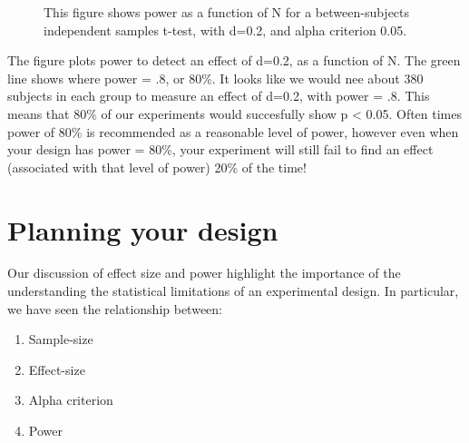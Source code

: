 \documentclass[
  letterpaper,
  DIV=11,
  numbers=noendperiod]{scrreprt}
\providecommand{\tightlist}{%
  \setlength{\itemsep}{0pt}\setlength{\parskip}{0pt}}\usepackage{longtable,booktabs,array}
\begin{document}
\begin{figure}


\caption{\label{fig-5.5powercurveN}This figure shows power as a function
of N for a between-subjects independent samples t-test, with d=0.2, and
alpha criterion 0.05.}

\end{figure}%

The figure plots power to detect an effect of d=0.2, as a function of N.
The green line shows where power = .8, or 80\%. It looks like we would
nee about 380 subjects in each group to measure an effect of d=0.2, with
power = .8. This means that 80\% of our experiments would succesfully
show p \textless{} 0.05. Often times power of 80\% is recommended as a
reasonable level of power, however even when your design has power =
80\%, your experiment will still fail to find an effect (associated with
that level of power) 20\% of the time!

\section{Planning your design}\label{planning-your-design}

Our discussion of effect size and power highlight the importance of the
understanding the statistical limitations of an experimental design. In
particular, we have seen the relationship between:

\begin{enumerate}
\def\labelenumi{\arabic{enumi}.}
\tightlist
\item
  Sample-size
\item
  Effect-size
\item
  Alpha criterion
\item
  Power
\end{enumerate}
\end{document}
